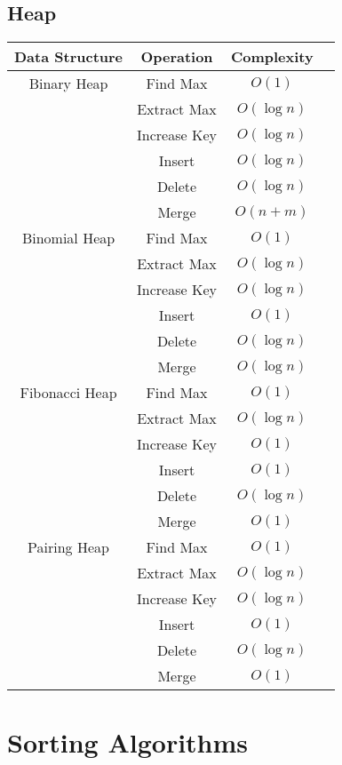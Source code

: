 \documentclass{article}
\begin{document}
\newpage
\subsection*{Heap}

\begin{table}[ht]
	\centering
	\scriptsize
	\begin{tabular}{c ccc}
		\textbf{Data Structure} & \textbf{Operation} & \textbf{Complexity} \\
		\hline
		Binary Heap & Find Max & $O(1)$ \\
		& Extract Max & $O(\log{n})$ \\
		& Increase Key & $O(\log{n})$ \\
		& Insert & $O(\log{n})$ \\
		& Delete & $O(\log{n})$ \\
		& Merge & $O(n+m)$ \\
		\hline
		Binomial Heap & Find Max & $O(1)$ \\
		& Extract Max & $O(\log{n})$ \\
		& Increase Key & $O(\log{n})$ \\
		& Insert & $O(1)$ \\
		& Delete & $O(\log{n})$ \\
		& Merge & $O(\log{n})$ \\
		\hline
		Fibonacci Heap & Find Max & $O(1)$ \\
		& Extract Max & $O(\log{n})$ \\
		& Increase Key & $O(1)$ \\
		& Insert & $O(1)$ \\
		& Delete & $O(\log{n})$ \\
		& Merge & $O(1)$ \\
		\hline
		Pairing Heap & Find Max & $O(1)$ \\
		& Extract Max & $O(\log{n})$ \\
		& Increase Key & $O(\log{n})$ \\
		& Insert & $O(1)$ \\
		& Delete & $O(\log{n})$ \\
		& Merge & $O(1)$ \\
		\hline
	\end{tabular}
\end{table}


\newpage
\section*{Sorting Algorithms}
\end{document}
